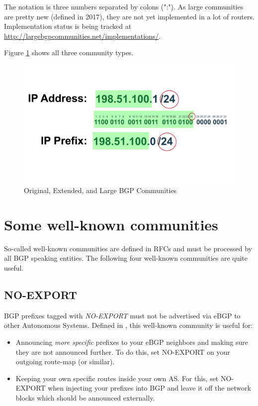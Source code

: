The notation is three numbers separated by colons (":"). As large communities are pretty new (defined in 2017), they are not yet implemented in a lot of routers. Implementation status is being tracked at \url{http://largebgpcommunities.net/implementations/}.

Figure \ref{fig:communities} shows all three community types.

\begin{figure}
  \centering
  \includegraphics[width=\linewidth,page=5]{img/Drawings.pdf}
  \caption{Original, Extended, and Large BGP Communities}
  \label{fig:communities}
\end{figure}


\section{Some well-known communities}
\label{wellknown}
So-called well-known communities are defined in RFCs and must be processed by all BGP speaking entities. The following four well-known communities are quite useful.

\subsection{NO-EXPORT}
BGP prefixes tagged with \emph{NO-EXPORT} must not be advertised via eBGP to other Autonomous Systems. Defined in \cite{rfc1997}, this well-known community is useful for:
\begin{itemize}
  \item Announcing \emph{more specific} prefixes to your eBGP neighbors and making sure they are not announced further. To do this, set NO-EXPORT on your outgoing route-map (or similar).
  \item Keeping your own specific routes inside your own AS. For this, set NO-EXPORT when injecting your prefixes into BGP and leave it off the network blocks which should be announced externally.
\end{itemize}


